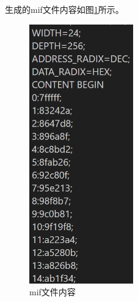 \documentclass[UTF8]{ctexart}
\begin{document}
生成的mif文件内容如图\ref{fig:mif}所示。
\begin{figure}[!ht]
    \centering
    \includegraphics[width=0.4\textwidth]{mif.png}
    \caption{mif文件内容}
    \label{fig:mif}
\end{figure}
\FloatBarrier
\end{document}
